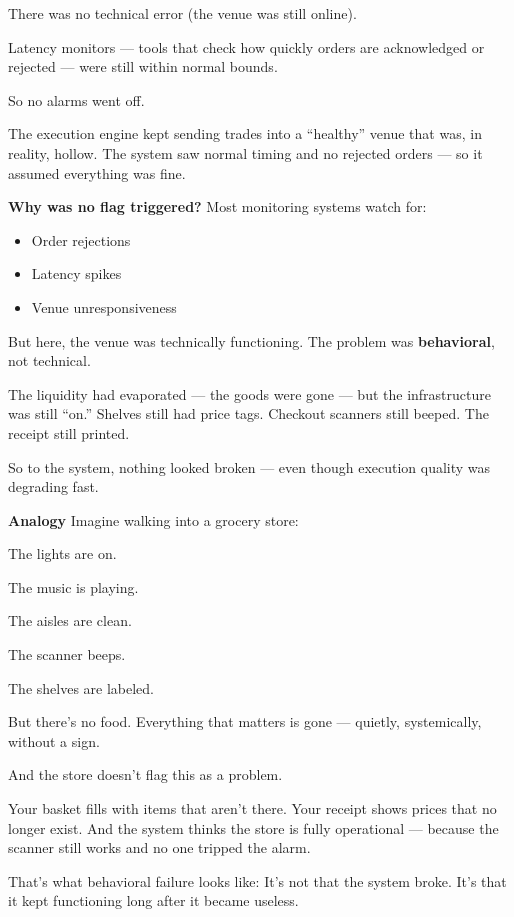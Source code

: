 There was no technical error (the venue was still online).

Latency monitors — tools that check how quickly orders are acknowledged or rejected — were still within normal 
bounds.

So no alarms went off.

The execution engine kept sending trades into a “healthy” venue that was, in reality, hollow. The system saw 
normal timing and no rejected orders — so it assumed everything was fine.

\textbf{Why was no flag triggered?}  Most monitoring systems watch for:

\begin{itemize}
  \item Order rejections
  \item Latency spikes
  \item Venue unresponsiveness
\end{itemize}

But here, the venue was technically functioning.
The problem was \textbf{behavioral}, not technical.

The liquidity had evaporated — the goods were gone — but the infrastructure was still “on.”
Shelves still had price tags. Checkout scanners still beeped. The receipt still printed.

So to the system, nothing looked broken — even though execution quality was degrading fast.

\textbf{Analogy}
Imagine walking into a grocery store:

The lights are on.

The music is playing.

The aisles are clean.

The scanner beeps.

The shelves are labeled.

But there’s no food.
Everything that matters is gone — quietly, systemically, without a sign.

And the store doesn’t flag this as a problem.

Your basket fills with items that aren’t there.
Your receipt shows prices that no longer exist.
And the system thinks the store is fully operational — because the scanner still works and no one tripped the alarm.

That’s what behavioral failure looks like:
It’s not that the system broke. It’s that it kept functioning long after it became useless.




